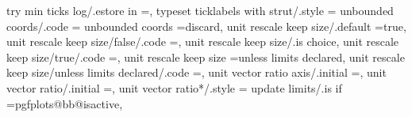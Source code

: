 {{{{{{{{{{{{{{{{{{{{{{{{{{{{{{{{{{{{{{{{{{{{{{{{{{{{{{{{{{{{{{{{try min ticks log/.estore in                                       =\pgfplots@default@try@minticks@log,                                                                                                
typeset ticklabels with strut/.style                               ={                                                                                                                                  
unbounded coords/.code                                             ={%
unbounded coords                                                   =discard,                                                                                                                           
unit rescale keep size/.default                                    =true,                                                                                                                              
unit rescale keep size/false/.code                                 ={\def\pgfplots@unit@vector@rescale@keep@size{0}},                                                                                  
unit rescale keep size/.is choice,
unit rescale keep size/true/.code                                  ={\def\pgfplots@unit@vector@rescale@keep@size{1}},                                                                                  
unit rescale keep size                                             =unless limits declared,                                                                                                            
unit rescale keep size/unless limits declared/.code                ={\def\pgfplots@unit@vector@rescale@keep@size{2}},                                                                                  
unit vector ratio axis/.initial                                    =,%
unit vector ratio/.initial                                         =,%
unit vector ratio*/.style                                          ={%
update limits/.is if                                               =pgfplots@bb@isactive,                                                                                                              
}}}}}}}}}}}}}}}}}}}}}}}}}}}}}}}}}}}}}}}}}}}}}}}}}}}}}}}}}}}}}}}}}}}
